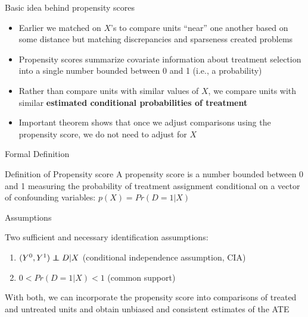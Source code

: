 \documentclass{beamer}
\newcommand\independent{\protect\mathpalette{\protect\independenT}{\perp}}
\def\independenT#1#2{\mathrel{\rlap{$#1#2$}\mkern2mu{#1#2}}}
\begin{document}
\begin{frame}{Basic idea behind propensity scores}
	
	\begin{itemize}
	\item Earlier we matched on $X$'s to compare units ``near'' one another based on some distance but matching discrepancies and sparseness created problems
	\item Propensity scores summarize covariate information about treatment selection into a single number bounded between 0 and 1 (i.e., a probability)
	\item Rather than compare units with similar values of $X$, we compare units with similar \textbf{estimated conditional probabilities of treatment}
	\item Important theorem shows that once we adjust comparisons using the propensity score, we do not need to adjust for $X$
	\end{itemize}
\end{frame}



\begin{frame}{Formal Definition}
	
	\begin{block}{Definition of Propensity score}
	A propensity score is a number bounded between 0 and 1 measuring the probability of treatment assignment conditional on a vector of confounding variables: $p(X)=Pr(D=1 | X)$
	\end{block}

\end{frame}

\begin{frame}{Assumptions}

	Two sufficient and necessary identification assumptions:
	\begin{enumerate}
	\item $(Y^0,Y^1) \independent{D}|X$ (conditional independence assumption, CIA)
	\item $0<Pr(D=1|X)<1$ (common support)
	\end{enumerate}
	
	With both, we can incorporate the propensity score into comparisons of treated and untreated units and obtain unbiased and consistent estimates of the ATE

\end{frame}
\end{document}
